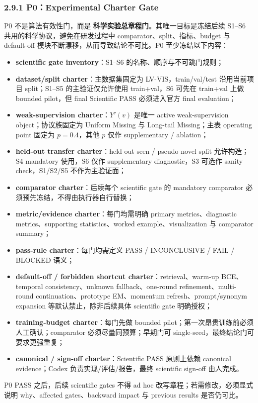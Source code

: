 \documentclass[UTF8]{ctexart}
\begin{document}
\subsubsection*{2.9.1 P0：Experimental Charter Gate}
P0 不是算法有效性门，而是 \textbf{科学实验总章程门}。其唯一目标是冻结后续 S1--S6 共用的科学协议，避免在研发过程中 comparator、split、指标、budget 与 default-off 模块不断漂移，从而导致结论不可比。P0 至少冻结以下内容：
\begin{itemize}
\item \textbf{scientific gate inventory}：S1--S6 的名称、顺序与不可跳门规则；
\item \textbf{dataset/split charter}：主数据集固定为 LV-VIS，train/val/test 沿用当前项目 split；S1--S5 的主验证仅允许使用 train+val，S6 可先在 train+val 上做 bounded pilot，但 final Scientific PASS 必须进入官方 final evaluation；
\item \textbf{weak-supervision charter}：$Y'(v)$ 是唯一 active weak-supervision object；协议族固定为 Uniform Missing 与 Long-tail Missing；主表 operating point 固定为 $p=0.4$，其他 $p$ 仅作 supplementary / ablation；
\item \textbf{held-out transfer charter}：held-out-seen / pseudo-novel split 允许构造；S4 mandatory 使用，S6 仅作 supplementary diagnostic，S3 可选作 sanity check，S1/S2/S5 不作为主验证面；
\item \textbf{comparator charter}：后续每个 scientific gate 的 mandatory comparator 必须预先冻结，不得由执行器自行替换；
\item \textbf{metric/evidence charter}：每门均需明确 primary metrics、diagnostic metrics、supporting statistics、worked example、visualization 与 comparator summary；
\item \textbf{pass-rule charter}：每门均需定义 PASS / INCONCLUSIVE / FAIL / BLOCKED 语义；
\item \textbf{default-off / forbidden shortcut charter}：retrieval、warm-up BCE、temporal consistency、unknown fallback、one-round refinement、multi-round continuation、prototype EM、momentum refresh、prompt/synonym expansion 等默认禁止，除非后续具体 scientific gate 明确授权；
\item \textbf{training-budget charter}：每门先做 bounded pilot；第一次昂贵训练前必须人工确认；comparator 必须尽量同预算；早期门可 single-seed，最终结论门可要求更强重复；
\item \textbf{canonical / sign-off charter}：Scientific PASS 原则上依赖 canonical evidence；Codex 负责实现/评估/报告，最终 scientific sign-off 由人完成。
\end{itemize}
P0 PASS 之后，后续 scientific gates 不得 ad hoc 改写章程；若需修改，必须显式说明 why、affected gates、backward impact 与 previous results 是否仍可比。
\end{document}

